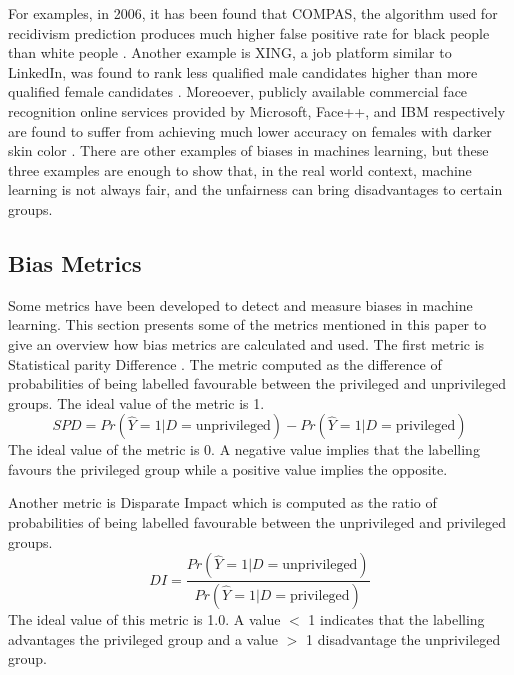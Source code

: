 \documentclass[sigconf,review]{acmart}
\begin{document}
For examples, in 2006, it has been found that COMPAS, the algorithm used for recidivism prediction produces much higher false positive rate for black people than white people \cite{angwin2016machine}. Another example is XING, a job platform similar to LinkedIn, was found to rank less qualified male candidates higher than more qualified female candidates \cite{lahoti2019ifair}. Moreoever, publicly available commercial face recognition online services provided by Microsoft, Face++, and IBM respectively are found to suffer from achieving much lower accuracy on females with darker skin color \cite{buolamwini2018gender}. There are other examples of biases in machines learning, but these three examples are enough to show that, in the real world context, machine learning is not always fair, and the unfairness can bring disadvantages to certain groups. 

\subsection{Bias Metrics}
\label{sec:bias_metrics}
Some metrics have been developed to detect and measure biases in machine learning. This section presents some of the metrics mentioned in this paper to give an overview how bias metrics are calculated and used. The first metric is Statistical parity Difference \cite{dwork2012fairness,bellamy2018ai}. The metric computed as the difference of probabilities of being labelled favourable between the privileged and unprivileged groups. The ideal value of the metric is 1.
\begin{equation} \label{eq:1}
	SPD = Pr(\hat{Y} = 1 | D = \text{unprivileged})
	- Pr(\hat{Y} = 1 | D = \text{privileged})
\end{equation}
The ideal value of the metric is 0. A negative value implies that the labelling favours the privileged group while a positive value implies the opposite.

Another metric is Disparate Impact \cite{feldman2015disparate,bellamy2018ai} which is computed as the ratio of probabilities of being labelled favourable between the unprivileged and privileged groups.
\begin{equation}
	DI = \frac{Pr(\hat{Y} = 1 | D = \text{unprivileged})}
	{Pr(\hat{Y} = 1 | D = \text{privileged})}
\end{equation}
The ideal value of this metric is 1.0. A value $<$ 1 indicates that the labelling advantages the privileged group and a value $>$ 1 disadvantage the unprivileged group.
\end{document}
